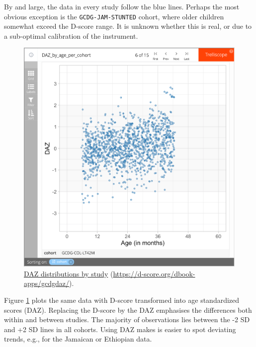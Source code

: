 \documentclass[
]{book}
\begin{document}
By and large, the data in every study follow the blue lines. Perhaps the most obvious exception is the \texttt{GCDG-JAM-STUNTED} cohort, where older children somewhat exceed the D-score range. It is unknown whether this is real, or due to a sub-optimal calibration of the instrument.

\begin{figure}

{\centering \includegraphics[width=1\linewidth]{fig/fig_6.1a} 

}

\caption{\href{https://d-score.org/dbook-apps/gcdgdaz/\#display=by_cohort\&nrow=1\&ncol=1\&arr=row\&pg=6\&labels=cohort\&sort=cohort;asc\&filter=\&sidebar=\&fv=}{DAZ distributions by study} (\url{https://d-score.org/dbook-apps/gcdgdaz/}).}\label{fig:dazdist}
\end{figure}



Figure \ref{fig:dazdist} plots the same data with D-score transformed into age standardized scores (DAZ). Replacing the D-score by the DAZ emphasises the differences both within and between studies. The majority of observations lies between the -2 SD and +2 SD lines in all cohorts. Using DAZ makes is easier to spot deviating trends, e.g., for the Jamaican or Ethiopian data.
\end{document}
